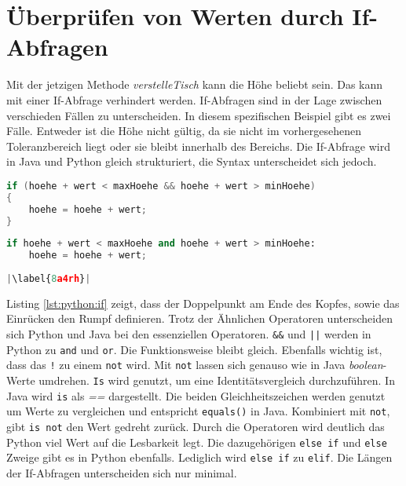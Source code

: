 \section{Überprüfen von Werten durch If-Abfragen}
Mit der jetzigen Methode \textit{verstelleTisch} kann die Höhe beliebt sein. Das kann mit einer If-Abfrage verhindert werden. If-Abfragen sind in der Lage zwischen verschieden Fällen zu unterscheiden. In diesem spezifischen Beispiel gibt es zwei Fälle. Entweder ist die Höhe nicht gültig, da sie nicht im vorhergesehenen Toleranzbereich liegt oder sie bleibt innerhalb des Bereichs. Die If-Abfrage wird in Java und Python gleich strukturiert, die Syntax unterscheidet sich jedoch. \cite{Python3:Buch}\cite{Louis:2010}

\begin{minipage}{.5\linewidth}
\begin{lstlisting}[language=java,caption={If-Abfrage in Java},captionpos=b,label={lst:java:if},frame=none]
if (hoehe + wert < maxHoehe && hoehe + wert > minHoehe)
{
    hoehe = hoehe + wert;
}
\end{lstlisting}
\end{minipage}
\begin{minipage}{.5\linewidth}
\begin{lstlisting}[language=python,caption={If-Abfrage in Python},captionpos=b,label={lst:python:if},frame=l,escapechar=|]
if hoehe + wert < maxHoehe and hoehe + wert > minHoehe:
    hoehe = hoehe + wert;
    
|\label{8a4rh}|
\end{lstlisting}
\end{minipage}

Listing \ref{lst:python:if} zeigt, dass der Doppelpunkt am Ende des Kopfes, sowie das Einrücken den Rumpf definieren.
Trotz der Ähnlichen Operatoren unterscheiden sich Python und Java bei den essenziellen Operatoren. \texttt{\&\&} und \texttt{||} werden in Python zu \texttt{and} und \texttt{or}. Die Funktionsweise bleibt gleich. Ebenfalls wichtig ist, dass das \texttt{!} zu einem \texttt{not} wird. Mit \texttt{not} lassen sich genauso wie in Java \textit{boolean}-Werte umdrehen. \texttt{Is} wird genutzt, um eine Identitätsvergleich durchzuführen. In Java wird \texttt{is} als \textit{==} dargestellt. Die beiden Gleichheitszeichen werden genutzt um Werte zu vergleichen und entspricht \texttt{equals()} in Java. Kombiniert mit \texttt{not}, gibt \texttt{is not} den Wert gedreht zurück. Durch die Operatoren wird deutlich das Python viel Wert auf die Lesbarkeit legt.
Die dazugehörigen \texttt{else if} und \texttt{else} Zweige gibt es in Python ebenfalls. Lediglich wird \texttt{else if} zu \texttt{elif}.  Die Längen der If-Abfragen unterscheiden sich nur minimal.\cite{Python3:Buch}\cite{Louis:2010}\par

